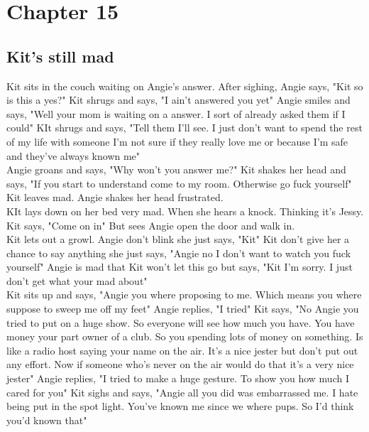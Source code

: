 \documentclass{article}[12px] %
\begin{document}
\section* {Chapter 15}        %
\subsection* {Kit's still mad}%
Kit sits in the couch waiting on Angie's answer. After sighing, Angie says, "Kit so is this a yes?" Kit shrugs and says, "I ain't answered you yet" Angie smiles and says, "Well your mom is waiting on a answer. I sort of already asked them if I could" KIt shrugs and says, "Tell them I'll see. I just don't want to spend the rest of my life with someone I'm not sure if they really love me or because I'm safe and they've always known me"\\

Angie groans and says, "Why won't you answer me?" Kit shakes her head and says, "If you start to understand come to my room. Otherwise go fuck yourself" Kit leaves mad. Angie shakes her head frustrated.\\

KIt lays down on her bed very mad. When she hears a knock. Thinking it's Jessy. Kit says, "Come on in" But sees Angie open the door and walk in.\\

Kit lets out a growl. Angie don't blink she just says, "Kit" Kit don't give her a chance to say anything she just says, "Angie no I don't want to watch you fuck yourself" Angie is mad that Kit won't let this go but says, "Kit I'm sorry. I just don't get what your mad about"\\

Kit sits up and says, "Angie you where proposing to me. Which means you where suppose to sweep me off my feet" Angie replies, "I tried" Kit says, "No Angie you tried to put on a huge show. So everyone will see how much you have. You have money your part owner of a club. So you spending lots of money on something. Is like a radio host saying your name on the air. It's a nice jester but don't put out any effort. Now if someone who's never on the air would do that it's a very nice jester" Angie replies, "I tried to make a huge gesture. To show you how much I cared for you" Kit sighs and says, "Angie all you did was embarrassed me. I hate being put in the spot light. You've known me since we where pups. So I'd think you'd known that" \\
\end{document}
